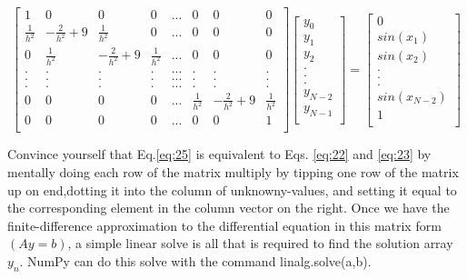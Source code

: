 \documentclass{book}
\theoremstyle{plain}
\theoremstyle{definition}
\numberwithin{exm}{chapter}
\theoremstyle{remark}
\theoremstyle{summary}
\theoremstyle{overview}
\begin{document}
\begin{equation} \label{eq:25}
	\begin{bmatrix}
		1 & 0 & 0 & 0 & ... & 0 & 0 & 0 \\
		\frac{1}{h^2} & -\frac{2}{h^2}+9 & \frac{1}{h^2} & 0 & ... & 0 & 0 & 0 \\
		0 &\frac{1}{h^2} & -\frac{2}{h^2}+9 & \frac{1}{h^2} & ... & 0 & 0 & 0 \\
		. & . & . & . & ... & .& . &. \\
		. & . & . & . & ... & .& . &. \\
		. & . & . & . & ... & .& . &. \\
		0 & 0 & 0 & 0 & ... & \frac{1}{h^2} & -\frac{2}{h^2}+9 & \frac{1}{h^2} \\
		0 & 0 & 0 & 0 & ... & 0 & 0 & 1  \\
	\end{bmatrix}
	\begin{bmatrix}
	y_0 \\ 
	y_1 \\ 
	y_2 \\ 
	. \\
	. \\
	. \\
	y_{N-2} \\ 
	y_{N-1} \\ 
	\end{bmatrix}
	=
	\begin{bmatrix}
		0 \\ 
		sin(x_1) \\
		sin(x_2) \\
		. \\
		. \\
		. \\
		sin(x_{N-2}) \\
		1 \\
	\end{bmatrix}
\end{equation}

Convince yourself that Eq.\eqref{eq:25} is equivalent to Eqs. \eqref{eq:22} and  \eqref{eq:23} by mentally doing each row of the matrix multiply by tipping one row of the matrix up on end,dotting it into the column of unknowny-values, and setting it equal to the corresponding element in the column vector on the right. Once we have the finite-difference approximation to the differential equation in this matrix form $(Ay=b)$, a simple linear solve is all that is required to find the solution array $y_n$. NumPy can do this solve with the command linalg.solve(a,b).
\end{document}
